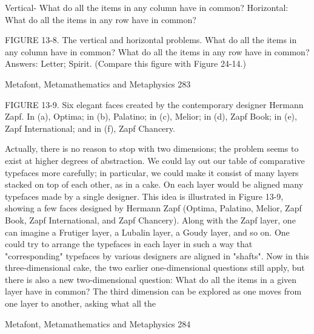        Vertical- What do all the items in any column have in common?
       Horizontal: What do all the items in any row have in common?

FIGURE 13-8. The vertical and horizontal problems. What do all the items in any column
have in common? What do all the items in any row have in common? Answers: Letter;
Spirit. (Compare this figure with Figure 24-14.)




Metafont, Metamathematics and Metaphysics                                                283

FIGURE 13-9. Six elegant faces created by the contemporary designer Hermann Zapf. In
(a), Optima; in (b), Palatino; in (c), Melior; in (d), Zapf Book; in (e), Zapf International;
and in (f), Zapf Chancery.

Actually, there is no reason to stop with two dimensions; the problem seems to exist at
higher degrees of abstraction. We could lay out our table of comparative typefaces more
carefully; in particular, we could make it consist of many layers stacked on top of each
other, as in a cake. On each layer would be aligned many typefaces made by a single
designer. This idea is illustrated in Figure 13-9, showing a few faces designed by
Hermann Zapf (Optima, Palatino, Melior, Zapf Book, Zapf International, and Zapf
Chancery). Along with the Zapf layer, one can imagine a Frutiger layer, a Lubalin layer,
a Goudy layer, and so on. One could try to arrange the typefaces in each layer in such a
way that "corresponding" typefaces by various designers are aligned in "shafts".
Now in this three-dimensional cake, the two earlier one-dimensional questions still apply,
but there is also a new two-dimensional question: What do all the items in a given layer
have in common? The third dimension can be explored as one moves from one layer to
another, asking what all the




Metafont, Metamathematics and Metaphysics                                                284

